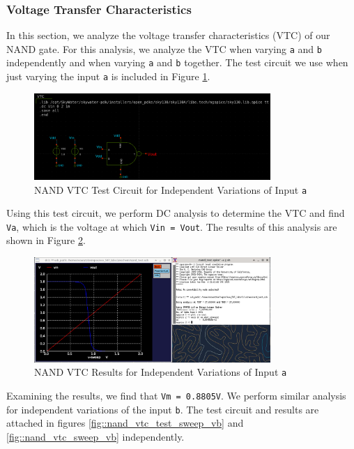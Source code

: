 \documentclass[fleqn]{article}
\begin{document}
	\subsubsection{Voltage Transfer Characteristics}
	
	In this section, we analyze the voltage transfer characteristics (VTC) of our NAND gate. For this analysis, we analyze the VTC when varying \texttt{a} and \texttt{b} independently and when varying \texttt{a} and \texttt{b} together. The test circuit we use when just varying the input \texttt{a} is included in Figure \ref{fig::nand_vtc_test_sweep_va}.
	
	\begin{figure}[H]
		\centerline{\includegraphics[width=0.8\textwidth]{nand_vtc_test_sweep_va.png}}
		\caption{NAND VTC Test Circuit for Independent Variations of Input \texttt{a}}
		\label{fig::nand_vtc_test_sweep_va}
	\end{figure}
	
	Using this test circuit, we perform DC analysis to determine the VTC and find \texttt{Va}, which is the voltage at which \texttt{Vin = Vout}. The results of this analysis are shown in Figure \ref{fig::nand_vtc_sweep_va}.
	
	\begin{figure}[H]
		\centerline{\includegraphics[width=0.8\textwidth]{nand_vtc_sweep_va.png}}
		\caption{NAND VTC Results for Independent Variations of Input \texttt{a}}
		\label{fig::nand_vtc_sweep_va}
	\end{figure}
	
	Examining the results, we find that \texttt{Vm = 0.8805V}. We perform similar analysis for independent variations of the input \texttt{b}. The test circuit and results are attached in figures \ref{fig::nand_vtc_test_sweep_vb} and \ref{fig::nand_vtc_sweep_vb} independently.
	
\end{document}
